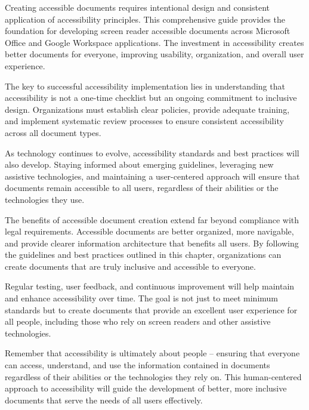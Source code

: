 Creating accessible documents requires intentional design and consistent application of accessibility principles. This comprehensive guide provides the foundation for developing screen reader accessible documents across Microsoft Office and Google Workspace applications. The investment in accessibility creates better documents for everyone, improving usability, organization, and overall user experience.

The key to successful accessibility implementation lies in understanding that accessibility is not a one-time checklist but an ongoing commitment to inclusive design. Organizations must establish clear policies, provide adequate training, and implement systematic review processes to ensure consistent accessibility across all document types.

As technology continues to evolve, accessibility standards and best practices will also develop. Staying informed about emerging guidelines, leveraging new assistive technologies, and maintaining a user-centered approach will ensure that documents remain accessible to all users, regardless of their abilities or the technologies they use.

The benefits of accessible document creation extend far beyond compliance with legal requirements. Accessible documents are better organized, more navigable, and provide clearer information architecture that benefits all users. By following the guidelines and best practices outlined in this chapter, organizations can create documents that are truly inclusive and accessible to everyone.

Regular testing, user feedback, and continuous improvement will help maintain and enhance accessibility over time. The goal is not just to meet minimum standards but to create documents that provide an excellent user experience for all people, including those who rely on screen readers and other assistive technologies.

Remember that accessibility is ultimately about people – ensuring that everyone can access, understand, and use the information contained in documents regardless of their abilities or the technologies they rely on. This human-centered approach to accessibility will guide the development of better, more inclusive documents that serve the needs of all users effectively.

